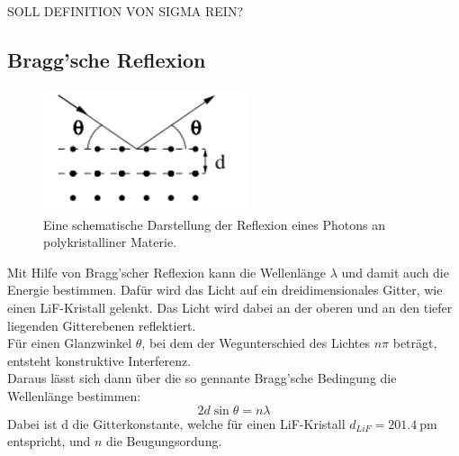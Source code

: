 SOLL DEFINITION VON SIGMA REIN?


\subsection{Bragg'sche Reflexion}

\begin{figure}
    \centering
    \includegraphics[width=6cm]{latex/images/bragg.PNG}
    \caption{Eine schematische Darstellung der Reflexion eines Photons an polykristalliner Materie\protect \cite{V602}.}
    \label{img:comp}
\end{figure}
Mit Hilfe von Bragg'scher Reflexion kann die Wellenlänge $\lambda$  und damit auch die Energie bestimmen.
Dafür wird das Licht auf ein dreidimensionales Gitter, wie einen LiF-Kristall gelenkt. Das Licht wird dabei an der oberen und an den tiefer liegenden Gitterebenen reflektiert.\\
Für einen Glanzwinkel $\theta$, bei dem der Wegunterschied des Lichtes $n\pi$ beträgt, entsteht konstruktive Interferenz.\\
Daraus lässt sich dann über die so gennante Bragg'sche Bedingung die Wellenlänge bestimmen:
\begin{equation*}
    2 d \sin \theta =n \lambda
\end{equation*}
Dabei ist d die Gitterkonstante, welche für einen LiF-Kristall $d_{LiF}=\SI{201.4}{\pico\metre}$ entspricht, und $n$ die Beugungsordung.



